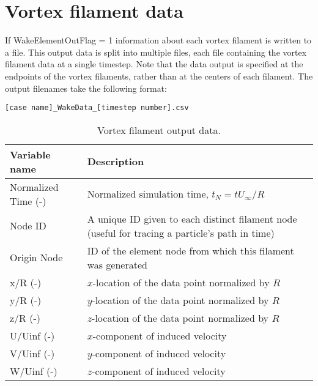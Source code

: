 \section{Vortex filament data}
If WakeElementOutFlag = 1 information about each vortex filament is written to a file. This output data is split into multiple files, each file containing the vortex filament data at a single timestep.
Note that the data output is specified at the endpoints of the vortex filaments, rather than at the centers of each filament.
The output filenames take the following format:

\begin{lstlisting}
[case name]_WakeData_[timestep number].csv
\end{lstlisting}

\begin{table}
\centering
\caption{Vortex filament output data.}
\label{tbl:output_vortex_filaments}
\begin{tabular}{p{}p{}}
\toprule
Variable name & Description \\ \midrule
Normalized Time (-) & Normalized simulation time, $t_N=t U_\infty/R$ \\
Node ID             & A unique ID given to each distinct filament node (useful for tracing a particle's path in time) \\
Origin Node         & ID of the element node from which this filament was generated \\
x/R (-)             & $x$-location of the data point normalized by $R$ \\
y/R (-)             & $y$-location of the data point normalized by $R$ \\
z/R (-)             & $z$-location of the data point normalized by $R$ \\
U/Uinf (-)          & $x$-component of induced velocity              \\
V/Uinf (-)          & $y$-component of induced velocity              \\
W/Uinf (-)          & $z$-component of induced velocity              \\
\bottomrule
\end{tabular}
\end{table}